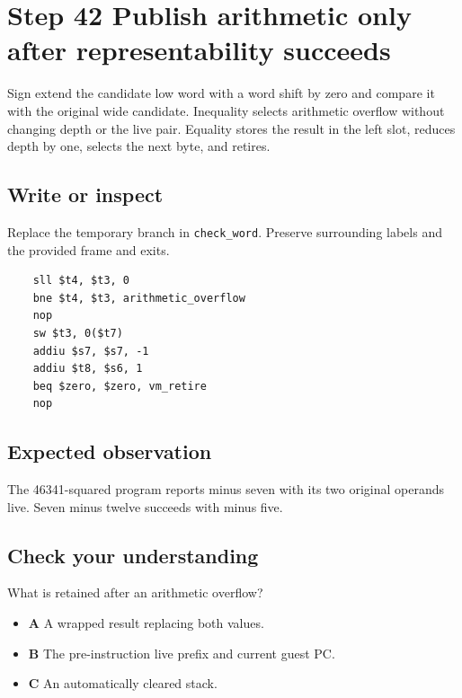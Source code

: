 \section{Step 42 Publish arithmetic only after representability succeeds}\label{vm-s42}

Sign extend the candidate low word with a word shift by zero and compare it with the original wide candidate. Inequality selects arithmetic overflow without changing depth or the live pair. Equality stores the result in the left slot, reduces depth by one, selects the next byte, and retires.

\subsection{Write or inspect}
Replace the temporary branch in \texttt{check\_word}. Preserve surrounding labels and the provided frame and exits.

\begin{verbatim}
    sll $t4, $t3, 0
    bne $t4, $t3, arithmetic_overflow
    nop
    sw $t3, 0($t7)
    addiu $s7, $s7, -1
    addiu $t8, $s6, 1
    beq $zero, $zero, vm_retire
    nop
\end{verbatim}
\subsection{Expected observation}
The 46341-squared program reports minus seven with its two original operands live. Seven minus twelve succeeds with minus five.

\subsection{Check your understanding}
What is retained after an arithmetic overflow?

\begin{itemize}
  \item \textbf{A} A wrapped result replacing both values.
  \item \textbf{B} The pre-instruction live prefix and current guest PC.
  \item \textbf{C} An automatically cleared stack.
\end{itemize}
